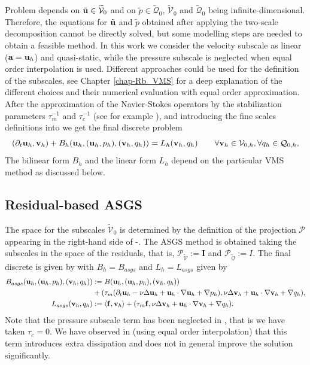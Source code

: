 Problem  depends on $\tilde{{\bf u}} \in \widetilde{\mathcal{V}}_0$ and on $\tilde{p}\in \widetilde{\mathcal{Q}}_0$,  $\widetilde{\mathcal{V}}_0$ and $\widetilde{\mathcal{Q}}_0$ being infinite-dimensional. Therefore, the equations for $\tilde{{\bf u}}$ and $\tilde{p}$ obtained after applying the two-scale decomposition cannot be directly solved, but some modelling steps are needed to obtain a feasible method. In this work we consider the velocity subscale as linear (${\bf a}={\bf u}_h$) and quasi-static, while the pressure subscale is neglected when equal order interpolation is used. Different approaches could be used for the definition of the subscales, see Chapter \ref{chap-Rb_VMS} for a deep explanation of the different choices and their numerical evaluation with equal order approximation. After the approximation of the  Navier-Stokes operators by the stabilization parameters $\tau_m^{-1}$  and $\tau_c^{-1}$ (see for example \cite{codina_time_2007}), and introducing the fine scales definitions into  we get the final discrete problem
\begin{equation}
\label{eq-C5_NS_discrete}
(\partial_t{\bf u}_h,{\bf v}_h)+B_h({\bf u}_h,({\bf u}_h,p_h),({\bf v}_h,q_h)) =L_h({\bf v}_h,q_h)\quad\quad\forall{\bf v}_h\in\mathcal{V}_{0,h},\forall q_h\in\mathcal{Q}_{0,h},
\end{equation}
The bilinear form $B_h$ and the linear form $L_h$ depend on the particular VMS method as discussed below.

\subsection{Residual-based ASGS}
\label{subsec-C5_ASGS}
The space for the subscales $\widetilde{\mathcal{V}}_0$ is determined by the definition of the projection $\mathcal{P}$ appearing in the right-hand side of -. The ASGS method is obtained taking the subscales in the space of the residuals, that is, $\mathcal{P}_{\widetilde{\mathcal{V}}}:=\mathbf{I}$ and $\mathcal{P}_{\widetilde{\mathcal{Q}}}:=I$. The final discrete is given by  with $B_h=B_{asgs}$ and $L_h=L_{asgs}$ given by
\begin{align}
\label{eq-C5_biliniar_asgs}
B_{asgs}({\bf u}_h,({\bf u}_h,p_h),({\bf v}_h,q_h))&:=B({\bf u}_h,({\bf u}_h,p_h),({\bf v}_h,q_h))\\\nonumber
&+(\tau_m(\partial_t{\bf u}_h-\nu\Delta{\bf u}_h+{\bf u}_h\cdot\nabla{\bf u}_h+\nabla p_h),\nu\Delta{\bf v}_h+{\bf u}_h\cdot\nabla{\bf v}_h+\nabla q_h),\\
L_{asgs}({\bf v}_h,q_h)&:=\left<{\bf f},{\bf v}_h\right>+(\tau_m{\bf f},\nu\Delta{\bf v}_h+{\bf u}_h\cdot\nabla{\bf v}_h+\nabla q_h).
\end{align}
Note that the pressure subscale term has been neglected in , that is we have taken $\tau_c=0$. We have observed in \cite{colomes_assessment_2015} (using equal order interpolation) that this term introduces extra dissipation and does not in general improve the solution significantly.

